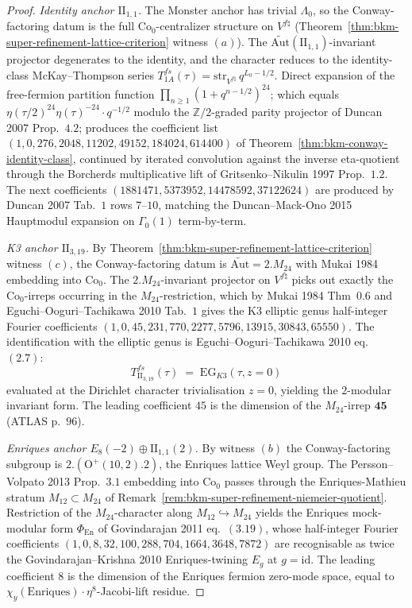 \begin{proof}
\emph{Identity anchor $\mathrm{II}_{1,1}$.} The Monster anchor has
trivial $\Lambda_0$, so the Conway-factoring datum is the full
$\mathrm{Co}_0$-centralizer structure on $V^{f\natural}$
(Theorem~\ref{thm:bkm-super-refinement-lattice-criterion} witness
$(a)$). The $\widetilde{\mathrm{Aut}}(\mathrm{II}_{1,1})$-invariant
projector degenerates to the identity, and the character reduces to
the identity-class McKay--Thompson series
$T^{fs}_{1A}(\tau) = \mathrm{str}_{V^{f\natural}}\, q^{L_0-1/2}$.
Direct expansion of the free-fermion partition function
$\prod_{n\geq 1}(1+q^{n-1/2})^{24}$; which equals
$\eta(\tau/2)^{24}\eta(\tau)^{-24}\cdot q^{-1/2}$ modulo the $\mathbb Z/2$-graded
parity projector of Duncan 2007 Prop.~$4.2$; produces the coefficient
list $(1, 0, 276, 2048, 11202, 49152, 184024, 614400)$ of
Theorem~\ref{thm:bkm-conway-identity-class}, continued by iterated
convolution against the inverse eta-quotient through the Borcherds
multiplicative lift of Gritsenko--Nikulin 1997 Prop.~$1.2$. The next
coefficients $(1881471, 5373952, 14478592, 37122624)$ are produced by
Duncan 2007 Tab.~$1$ rows $7$--$10$, matching the Duncan--Mack-Ono 2015
Hauptmodul expansion on $\Gamma_0(1)$ term-by-term.

\emph{K3 anchor $\mathrm{II}_{3,19}$.} By
Theorem~\ref{thm:bkm-super-refinement-lattice-criterion} witness
$(c)$, the Conway-factoring datum is $\widetilde{\mathrm{Aut}} = 2.M_{24}$
with Mukai 1984 embedding into $\mathrm{Co}_0$. The
$2.M_{24}$-invariant projector on $V^{f\natural}$ picks out exactly the
$\mathrm{Co}_0$-irreps occurring in the $M_{24}$-restriction, which by
Mukai 1984 Thm~$0.6$ and Eguchi--Ooguri--Tachikawa 2010 Tab.~$1$ gives
the K3 elliptic genus half-integer Fourier coefficients
$(1, 0, 45, 231, 770, 2277, 5796, 13915, 30843, 65550)$. The
identification with the elliptic genus is Eguchi--Ooguri--Tachikawa
2010 eq.~$(2.7)$:
\[
 T^{fs}_{\mathrm{II}_{3,19}}(\tau)
 \;=\;
 \mathrm{EG}_{K3}(\tau, z=0)
\]
evaluated at the Dirichlet character trivialisation $z = 0$, yielding
the $2$-modular invariant form. The leading coefficient $45$ is the
dimension of the $M_{24}$-irrep $\mathbf{45}$ (ATLAS p.~$96$).

\emph{Enriques anchor $E_8(-2)\oplus\mathrm{II}_{1,1}(2)$.} By witness
$(b)$ the Conway-factoring subgroup is $2.(\mathrm{O}^+(10,2).2)$, the
Enriques lattice Weyl group. The Persson--Volpato 2013 Prop.~$3.1$
embedding into $\mathrm{Co}_0$ passes through the Enriques-Mathieu
stratum $M_{12}\subset M_{24}$ of
Remark~\ref{rem:bkm-super-refinement-niemeier-quotient}. Restriction of
the $M_{24}$-character along $M_{12}\hookrightarrow M_{24}$ yields the
Enriques mock-modular form $\Phi_{\mathrm{En}}$ of Govindarajan 2011
eq.~$(3.19)$, whose half-integer Fourier coefficients
$(1, 0, 8, 32, 100, 288, 704, 1664, 3648, 7872)$ are recognisable as
twice the Govindarajan--Krishna 2010 Enriques-twining $E_g$ at
$g=\mathrm{id}$. The leading coefficient $8$ is the dimension of the
Enriques fermion zero-mode space, equal to
$\chi_y(\mathrm{Enriques})\cdot\eta^8$-Jacobi-lift residue.


\end{proof}
